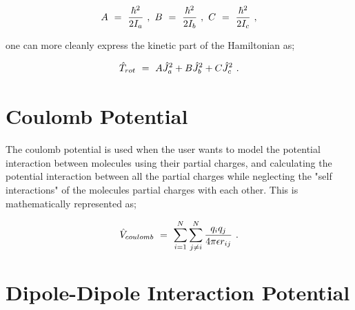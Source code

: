 \documentclass{ece}
\begin{document}
\begin{equation} \label{eq:65}
A \hspace{0.125cm} = \hspace{0.125cm} \frac{\hbar^2}{2 I_{a}} \hspace{0.125cm} , \hspace{0.125cm} B \hspace{0.125cm} = \hspace{0.125cm} \frac{\hbar^2}{2 I_{b}} \hspace{0.125cm} , \hspace{0.125cm} C \hspace{0.125cm} = \hspace{0.125cm} \frac{\hbar^2}{2 I_{c}} \hspace{0.125cm} ,
\end{equation}

one can more cleanly express the kinetic part of the Hamiltonian as;

\begin{equation} \label{eq:66}
\hat{T}_{rot} \hspace{0.125cm} = \hspace{0.125cm} A \hat{J}^{2}_{a} + B \hat{J}^{2}_{b} + C \hat{J}^{2}_{c} \hspace{0.125cm} .
\end{equation}

\section{Coulomb Potential}
\label{app:potengc}

The coulomb potential is used when the user wants to model the potential interaction between molecules using their partial charges, and calculating the potential interaction between all the partial charges while neglecting the "self interactions" of the molecules partial charges with each other. This is mathematically represented as;

\begin{equation} \label{eq:67}
\hat{V}_{coulomb} \hspace{0.125cm} = \hspace{0.125cm} \sum_{i = 1}^{N} \sum_{j \neq i}^{N} \frac{q_i q_j}{4 \pi \epsilon r_{ij}} \hspace{0.125cm} .
\end{equation}

\section{Dipole-Dipole Interaction Potential}
\label{app:potengdd}
\end{document}
